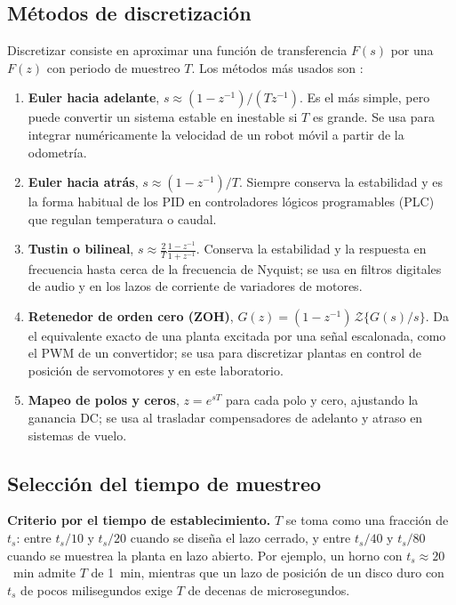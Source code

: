 \documentclass[conference]{IEEEtran}
\begin{document}
\subsection{Métodos de discretización}
Discretizar consiste en aproximar una función de transferencia $F(s)$ por una
$F(z)$ con periodo de muestreo $T$. Los métodos más usados son
\cite{ogata1995, franklin1998}:
\begin{enumerate}
  \item \textbf{Euler hacia adelante}, $s \approx (1-z^{-1})/(Tz^{-1})$. Es el
        más simple, pero puede convertir un sistema estable en inestable si $T$
        es grande. Se usa para integrar numéricamente la velocidad de un robot
        móvil a partir de la odometría.
  \item \textbf{Euler hacia atrás}, $s \approx (1-z^{-1})/T$. Siempre conserva
        la estabilidad y es la forma habitual de los PID en controladores
        lógicos programables (PLC) que regulan temperatura o caudal.
  \item \textbf{Tustin o bilineal},
        $s \approx \frac{2}{T}\frac{1-z^{-1}}{1+z^{-1}}$. Conserva la
        estabilidad y la respuesta en frecuencia hasta cerca de la frecuencia
        de Nyquist; se usa en filtros digitales de audio y en los lazos de
        corriente de variadores de motores.
  \item \textbf{Retenedor de orden cero (ZOH)},
        $G(z) = (1-z^{-1})\,\mathcal{Z}\{G(s)/s\}$. Da el equivalente exacto de
        una planta excitada por una señal escalonada, como el PWM de un
        convertidor; se usa para discretizar plantas en control de posición de
        servomotores y en este laboratorio.
  \item \textbf{Mapeo de polos y ceros}, $z = e^{sT}$ para cada polo y cero,
        ajustando la ganancia DC; se usa al trasladar compensadores de adelanto
        y atraso en sistemas de vuelo.
\end{enumerate}

\subsection{Selección del tiempo de muestreo}
\textbf{Criterio por el tiempo de establecimiento.} $T$ se toma como una
fracción de $t_s$: entre $t_s/10$ y $t_s/20$ cuando se diseña el lazo cerrado,
y entre $t_s/40$ y $t_s/80$ cuando se muestrea la planta en lazo abierto. Por
ejemplo, un horno con $t_s\approx 20$~min admite $T$ de 1~min, mientras que un
lazo de posición de un disco duro con $t_s$ de pocos milisegundos exige
$T$ de decenas de microsegundos.
\end{document}

